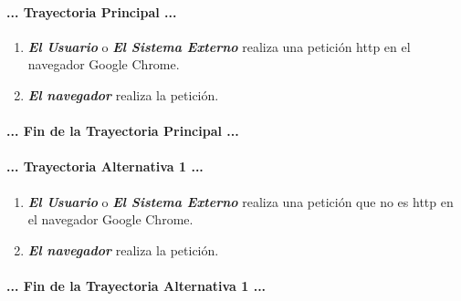 \documentclass[12pt, a4paper, titlepage]{report}
\begin{document}
				\paragraph{... Trayectoria Principal ...}
				\begin{enumerate}
					\item \textbf{\textit{El Usuario}} o \textbf{\textit{El Sistema Externo}} realiza una petición \acrshort{http} en el navegador Google Chrome.\\
					\item \textbf{\textit{El navegador}} realiza la petición.\\
				\end{enumerate}
				\paragraph{... Fin de la Trayectoria Principal ...}
				
				\paragraph{... Trayectoria Alternativa 1 ...}
				\begin{enumerate}
					\item \textbf{\textit{El Usuario}} o \textbf{\textit{El Sistema Externo}} realiza una petición que no es \acrshort{http} en el navegador Google Chrome.\\
					\item \textbf{\textit{El navegador}} realiza la petición.					
				\end{enumerate}
				\paragraph{... Fin de la Trayectoria Alternativa 1 ...}
				
\end{document}
